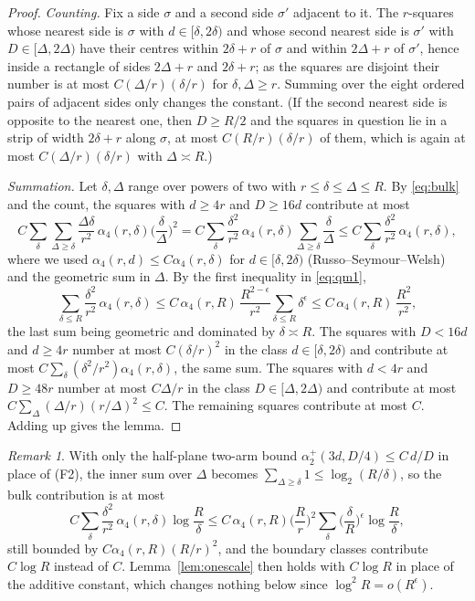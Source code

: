 \documentclass[11pt]{amsart}
\theoremstyle{remark}
\newtheorem{remark}[theorem]{Remark}
\begin{document}
\begin{proof}
\emph{Counting.} Fix a side $\sigma$ and a second side $\sigma'$ adjacent to it. The $r$-squares whose nearest side is $\sigma$ with $d\in[\delta,2\delta)$ and whose second nearest side is $\sigma'$ with $D\in[\Delta,2\Delta)$ have their centres within $2\delta+r$ of $\sigma$ and within $2\Delta+r$ of $\sigma'$, hence inside a rectangle of sides $2\Delta+r$ and $2\delta+r$; as the squares are disjoint their number is at most $C(\Delta/r)(\delta/r)$ for $\delta,\Delta\ge r$. Summing over the eight ordered pairs of adjacent sides only changes the constant. (If the second nearest side is opposite to the nearest one, then $D\ge R/2$ and the squares in question lie in a strip of width $2\delta+r$ along $\sigma$, at most $C(R/r)(\delta/r)$ of them, which is again at most $C(\Delta/r)(\delta/r)$ with $\Delta\asymp R$.)

\emph{Summation.} Let $\delta,\Delta$ range over powers of two with $r\le\delta\le\Delta\le R$. By \eqref{eq:bulk} and the count, the squares with $d\ge4r$ and $D\ge16d$ contribute at most
\[
C\sum_{\delta}\sum_{\Delta\ge\delta}\frac{\Delta\delta}{r^2}\,\alpha_4(r,\delta)\Big(\frac{\delta}{\Delta}\Big)^2
= C\sum_{\delta}\frac{\delta^2}{r^2}\,\alpha_4(r,\delta)\sum_{\Delta\ge\delta}\frac{\delta}{\Delta}
\le C\sum_{\delta}\frac{\delta^2}{r^2}\,\alpha_4(r,\delta),
\]
where we used $\alpha_4(r,d)\le C\alpha_4(r,\delta)$ for $d\in[\delta,2\delta)$ (Russo--Seymour--Welsh) and the geometric sum in $\Delta$. By the first inequality in \eqref{eq:qm1},
\[
\sum_{\delta\le R}\frac{\delta^2}{r^2}\,\alpha_4(r,\delta)\le C\,\alpha_4(r,R)\,\frac{R^{2-\epsilon}}{r^2}\sum_{\delta\le R}\delta^{\epsilon}\le C\,\alpha_4(r,R)\,\frac{R^2}{r^2},
\]
the last sum being geometric and dominated by $\delta\asymp R$. The squares with $D<16d$ and $d\ge4r$ number at most $C(\delta/r)^2$ in the class $d\in[\delta,2\delta)$ and contribute at most $C\sum_\delta(\delta^2/r^2)\alpha_4(r,\delta)$, the same sum. The squares with $d<4r$ and $D\ge48r$ number at most $C\Delta/r$ in the class $D\in[\Delta,2\Delta)$ and contribute at most $C\sum_{\Delta}(\Delta/r)(r/\Delta)^2\le C$. The remaining squares contribute at most $C$. Adding up gives the lemma.
\end{proof}

\begin{remark}\label{rem:twoarm}
With only the half-plane two-arm bound $\alpha_2^+(3d,D/4)\le C\,d/D$ in place of (F2), the inner sum over $\Delta$ becomes $\sum_{\Delta\ge\delta}1\le\log_2(R/\delta)$, so the bulk contribution is at most
\[
C\sum_\delta\frac{\delta^2}{r^2}\,\alpha_4(r,\delta)\log\frac R\delta\le C\,\alpha_4(r,R)\Big(\frac Rr\Big)^2\sum_\delta\Big(\frac\delta R\Big)^{\epsilon}\log\frac R\delta,
\]
still bounded by $C\alpha_4(r,R)(R/r)^2$, and the boundary classes contribute $C\log R$ instead of $C$. Lemma~\ref{lem:onescale} then holds with $C\log R$ in place of the additive constant, which changes nothing below since $\log^2R=o(R^{\epsilon})$.
\end{remark}
\end{document}
